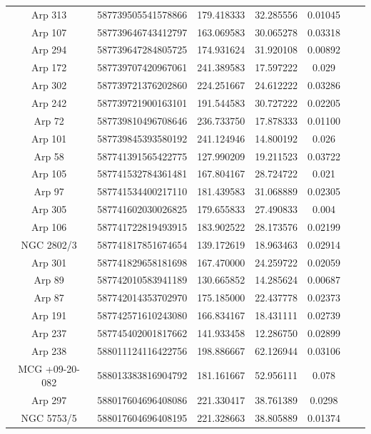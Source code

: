 \begin{table}
{\begin{tabular}{|c|c|c|c|c|c|c|}
         Arp 313 & 587739505541578866 & 179.418333 & 32.285556 & 0.01045 \\
         Arp 107 & 587739646743412797 & 163.069583 & 30.065278 & 0.03318 \\
         Arp 294 & 587739647284805725 & 174.931624 & 31.920108 & 0.00892 \\
         Arp 172 & 587739707420967061 & 241.389583 & 17.597222 & 0.029 \\
         Arp 302 & 587739721376202860 & 224.251667 & 24.612222 & 0.03286 \\
         Arp 242 & 587739721900163101 & 191.544583 & 30.727222 & 0.02205 \\
         Arp 72 & 587739810496708646 & 236.733750 & 17.878333 & 0.01100 \\
         Arp 101 & 587739845393580192 & 241.124946 & 14.800192 & 0.026 \\
         Arp 58 & 587741391565422775 & 127.990209 & 19.211523 & 0.03722 \\
         Arp 105 & 587741532784361481 & 167.804167 & 28.724722 & 0.021 \\
         Arp 97 & 587741534400217110 & 181.439583 & 31.068889 & 0.02305 \\
         Arp 305 & 587741602030026825 & 179.655833 & 27.490833 & 0.004 \\
         Arp 106 & 587741722819493915 & 183.902522 & 28.173576 & 0.02199 \\
         NGC 2802/3 & 587741817851674654 & 139.172619 & 18.963463 & 0.02914 \\
         Arp 301 & 587741829658181698 & 167.470000 & 24.259722 & 0.02059 \\
         Arp 89 & 587742010583941189 & 130.665852 & 14.285624 & 0.00687 \\
         Arp 87 & 587742014353702970 & 175.185000 & 22.437778 & 0.02373 \\
         Arp 191 & 587742571610243080 & 166.834167 & 18.431111 & 0.02739 \\
         Arp 237 & 587745402001817662 & 141.933458 & 12.286750 & 0.02899 \\
         Arp 238 & 588011124116422756 & 198.886667 & 62.126944 & 0.03106 \\
         MCG +09-20-082 & 588013383816904792 & 181.161667 & 52.956111 & 0.078 \\
         Arp 297 & 588017604696408086 & 221.330417 & 38.761389 & 0.0298 \\
         NGC 5753/5 & 588017604696408195 & 221.328663 & 38.805889 & 0.01374 \\

\end{tabular}}
\end{table}
